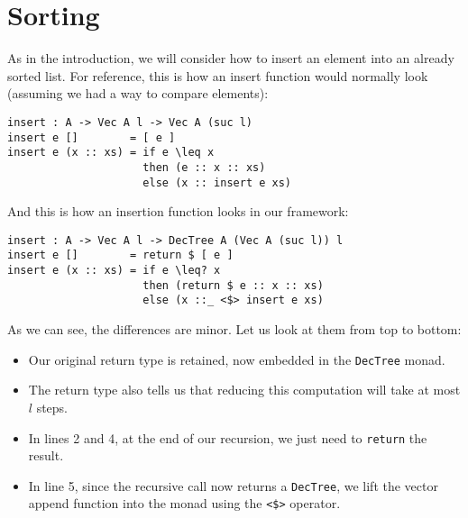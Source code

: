 
\section{Sorting}
\label{sec:sorting}

As in the introduction, we will consider how to insert an element into an already sorted list. For reference, this is how an insert function would normally look (assuming we had a way to compare elements):

\begin{lstlisting}[caption={Plain insertion},label={lst:insert:plain},emph={insert, if, then, else}]
insert : A -> Vec A l -> Vec A (suc l)
insert e []        = [ e ]
insert e (x :: xs) = if e \leq x
                     then (e :: x :: xs)
                     else (x :: insert e xs)
\end{lstlisting}

And this is how an insertion function looks in our framework:

\noindent\begin{minipage}{\linewidth}
\begin{lstlisting}[caption={Insertion with runtime bound},label={lst:insert:bounded},emph={insert,if,then,else,return}]
insert : A -> Vec A l -> DecTree A (Vec A (suc l)) l
insert e []        = return $ [ e ]
insert e (x :: xs) = if e \leq? x
                     then (return $ e :: x :: xs)
                     else (x ::_ <$> insert e xs)
\end{lstlisting}
\end{minipage}

As we can see, the differences are minor. Let us look at them from top to bottom:

\begin{itemize}
    \item Our original return type is retained, now embedded in the \texttt{DecTree} monad.
    \item The return type also tells us that reducing this computation will take at most $l$ steps.
    \item In lines 2 and 4, at the end of our recursion, we just need to \texttt{return} the result.
    \item In line 5, since the recursive call now returns a \texttt{DecTree}, we lift the vector append function into the monad using the \texttt{<\$>} operator.
\end{itemize}

